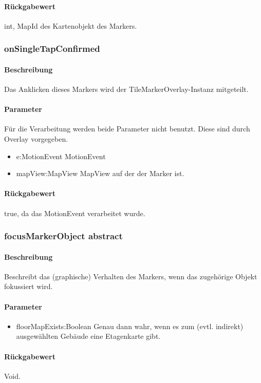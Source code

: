 \paragraph*{Rückgabewert}
int, MapId des Kartenobjekt des Markers.

\subsubsection{onSingleTapConfirmed}%
\paragraph*{Beschreibung}
Das Anklicken dieses Markers wird der TileMarkerOverlay-Instanz mitgeteilt.
\paragraph*{Parameter}
Für die Verarbeitung werden beide Parameter nicht benutzt. Diese sind durch Overlay vorgegeben.
\begin{itemize}
    \item e:MotionEvent MotionEvent
    \item mapView:MapView MapView auf der der Marker ist.
\end{itemize}
\paragraph*{Rückgabewert}
true, da das MotionEvent verarbeitet wurde.

\subsubsection{focusMarkerObject {abstract}}%
\paragraph*{Beschreibung}
Beschreibt das (graphische) Verhalten des Markers, wenn das zugehörige Objekt fokussiert wird.
\paragraph*{Parameter}
\begin{itemize}
    \item floorMapExists:Boolean Genau dann wahr, wenn es zum (evtl. indirekt) ausgewählten Gebäude eine Etagenkarte gibt.
\end{itemize}
\paragraph*{Rückgabewert}
Void.

